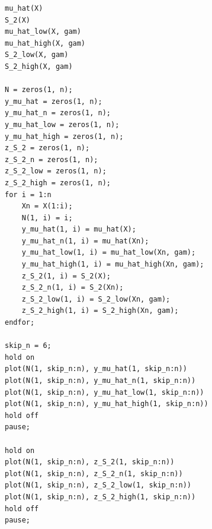 \begin{lstlisting}[firstnumber=37]
mu_hat(X)
S_2(X)
mu_hat_low(X, gam)
mu_hat_high(X, gam)
S_2_low(X, gam)
S_2_high(X, gam)

N = zeros(1, n);
y_mu_hat = zeros(1, n);
y_mu_hat_n = zeros(1, n);
y_mu_hat_low = zeros(1, n);
y_mu_hat_high = zeros(1, n);
z_S_2 = zeros(1, n);
z_S_2_n = zeros(1, n);
z_S_2_low = zeros(1, n);
z_S_2_high = zeros(1, n);
for i = 1:n
    Xn = X(1:i);
    N(1, i) = i;
	y_mu_hat(1, i) = mu_hat(X);
	y_mu_hat_n(1, i) = mu_hat(Xn);
	y_mu_hat_low(1, i) = mu_hat_low(Xn, gam);
	y_mu_hat_high(1, i) = mu_hat_high(Xn, gam);
	z_S_2(1, i) = S_2(X);
	z_S_2_n(1, i) = S_2(Xn);
	z_S_2_low(1, i) = S_2_low(Xn, gam);
	z_S_2_high(1, i) = S_2_high(Xn, gam);
endfor;

skip_n = 6;
hold on
plot(N(1, skip_n:n), y_mu_hat(1, skip_n:n))
plot(N(1, skip_n:n), y_mu_hat_n(1, skip_n:n))
plot(N(1, skip_n:n), y_mu_hat_low(1, skip_n:n))
plot(N(1, skip_n:n), y_mu_hat_high(1, skip_n:n))
hold off
pause;

hold on
plot(N(1, skip_n:n), z_S_2(1, skip_n:n))
plot(N(1, skip_n:n), z_S_2_n(1, skip_n:n))
plot(N(1, skip_n:n), z_S_2_low(1, skip_n:n))
plot(N(1, skip_n:n), z_S_2_high(1, skip_n:n))
hold off
pause;
\end{lstlisting}




